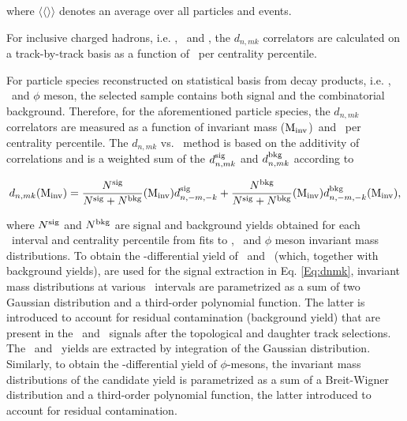 where $\langle\langle\rangle\rangle$ denotes an average over all particles and events.


For inclusive charged hadrons, i.e. \pion, \kaon~and \proton, the $d_{n,mk}$ correlators are calculated on a track-by-track basis as a function of \pT~per centrality percentile. 

For particle species reconstructed on statistical basis from decay products, i.e. \Ks, \lambdas~and $\phi$ meson, the selected sample contains both signal and the combinatorial background. Therefore, for the aforementioned particle species, the $d_{n,mk}$ correlators are measured as a function of invariant mass (${\rm M_{inv}}$)~and \pT~per centrality percentile. The $d_{n,mk}$ vs. \minv~method is based on the additivity of correlations and is a weighted sum of the $d_{n,mk}^{\rm{sig}}$ and $d_{n,mk}^{\rm{bkg}}$ according to

\begin{equation}
d_{n,mk}({\rm M}_{\rm inv}) = \frac{N^{\rm sig}}{N^{\rm sig}+N^{\rm bkg}}({\rm M}_{\rm inv})d_{n,-m,-k}^{\rm sig}+\frac{N^{\rm bkg}}{N^{{\rm sig}}+N^{{\rm bkg}}}({\rm M}_{\rm inv})d_{n,-m,-k}^{\rm bkg}({\rm M}_{\rm inv}),
\label{Eq:dnmk}
\end{equation}

where $N^{\rm{sig}}$ and $N^{\rm{bkg}}$ are signal and background yields obtained for each \pT~interval and centrality percentile from fits to \Ks, \lambdas~and $\phi$ meson invariant mass distributions.%
To obtain the \pT-differential yield of \Ks~and \lambdas~(which, together with background yields), are used for the signal extraction in Eq. \ref{Eq:dnmk}, invariant mass distributions at various \pT~intervals are parametrized as a sum of two Gaussian distribution and a third-order polynomial function. The latter is introduced to account for residual contamination (background yield) that are present in the \Ks~and \lambdas~signals after the topological and daughter track selections. The \Ks~and \lambdas~yields are extracted by integration of the Gaussian distribution. %
Similarly, to obtain the \pT-differential yield of $\phi$-mesons, the invariant mass distributions of the candidate yield is parametrized as a sum of a Breit-Wigner distribution and a third-order polynomial function, the latter introduced to account for residual contamination.

